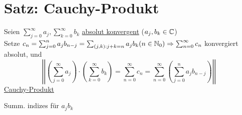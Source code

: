 \section{Satz: Cauchy-Produkt}\label{7.16}
Seien $\sum_{j=0}^\infty a_j, \sum_{k=0}^\infty b_k$ \underline{absolut konvergent} ($a_j, b_k \in \mathbb{C}$)\\
Setze $c_n = \sum_{j=0}^n a_j b_{n-j} = \sum_{(j,k):j+k=n} a_j b_k (n \in \mathbb{N}_0) \Rightarrow \sum_{n=0}^\infty c_n$ konvergiert absolut, und
$$\left|\left|\left(\sum_{j=0}^\infty a_j\right) \cdot \left(\sum_{k=0}^\infty b_k\right) = \sum_{n=0}^\infty c_n = \sum_{n=0}^\infty \left(\sum_{j=0}^n a_j b_{n-j}\right)\right|\right|$$
\underline{Cauchy-Produkt}\nl
{}
Summ. indizes für $a_j b_k$

